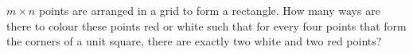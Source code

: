 $m\times n$ points are arranged in a grid to form a rectangle.
How many ways are there to colour these points red or white such that for every four
points that form the corners of a unit square, there are exactly two white and two red points?